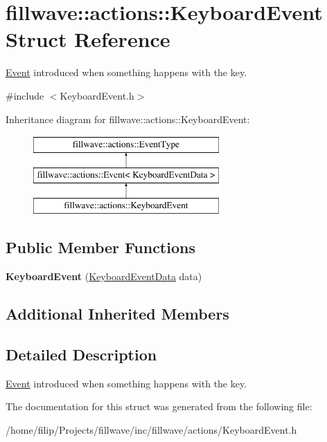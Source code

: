 \hypertarget{classfillwave_1_1actions_1_1KeyboardEvent}{}\section{fillwave\+:\+:actions\+:\+:Keyboard\+Event Struct Reference}
\label{classfillwave_1_1actions_1_1KeyboardEvent}


\hyperlink{classfillwave_1_1actions_1_1Event}{Event} introduced when something happens with the key.  




{\ttfamily \#include $<$Keyboard\+Event.\+h$>$}

Inheritance diagram for fillwave\+:\+:actions\+:\+:Keyboard\+Event\+:\begin{figure}[H]
\begin{center}
\leavevmode
\includegraphics[height=3.000000cm]{classfillwave_1_1actions_1_1KeyboardEvent}
\end{center}
\end{figure}
\subsection*{Public Member Functions}
\begin{DoxyCompactItemize}
\item 
\hypertarget{classfillwave_1_1actions_1_1KeyboardEvent_afed8f8066a7a067a4fd846d070b505a2}{}{\bfseries Keyboard\+Event} (\hyperlink{structfillwave_1_1actions_1_1KeyboardEventData}{Keyboard\+Event\+Data} data)\label{classfillwave_1_1actions_1_1KeyboardEvent_afed8f8066a7a067a4fd846d070b505a2}

\end{DoxyCompactItemize}
\subsection*{Additional Inherited Members}


\subsection{Detailed Description}
\hyperlink{classfillwave_1_1actions_1_1Event}{Event} introduced when something happens with the key. 

The documentation for this struct was generated from the following file\+:\begin{DoxyCompactItemize}
\item 
/home/filip/\+Projects/fillwave/inc/fillwave/actions/Keyboard\+Event.\+h\end{DoxyCompactItemize}
